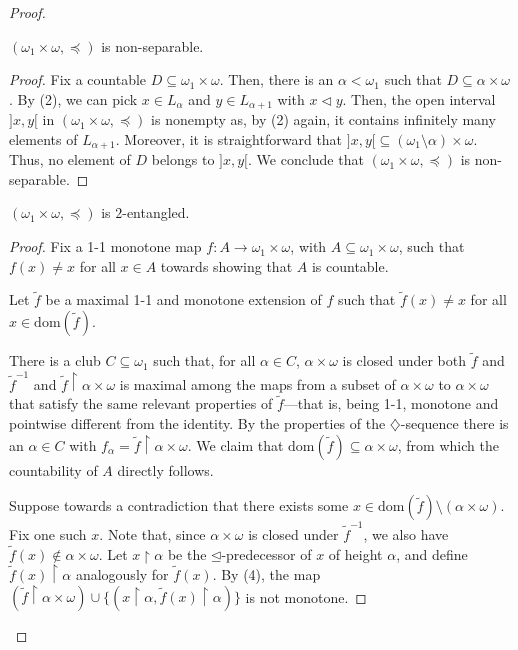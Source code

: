 \documentclass[10pt,a4paper]{amsart}
\begin{document}
\begin{proof}
\begin{claim}
$(\omega_1 \times \omega, \preceq)$ is non-separable.
\end{claim}
\begin{proof}
Fix a countable $D\subseteq \omega_1 \times \omega$. Then, there is an $\alpha < \omega_1$ such that $D\subseteq \alpha \times \omega$. By (2), we can pick $x \in L_\alpha$  and $y \in L_{\alpha+1}$  with $x \lhd y$. Then, the open interval $]x, y[$ in $(\omega_1 \times \omega, \preceq)$ is nonempty as, by (2) again, it contains infinitely many elements of $L_{\alpha+1}$. Moreover, it is straightforward that ${]x,y[} \subseteq (\omega_1\setminus \alpha) \times \omega$. Thus, no element of $D$ belongs to $]x,y[$. We conclude that $(\omega_1 \times \omega, \preceq)$ is non-separable.
\end{proof}


\begin{claim}
$(\omega_1 \times \omega, \preceq)$ is $2$-entangled.
\end{claim}
\begin{proof}
Fix a 1-1 monotone map $f: A \rightarrow \omega_1 \times \omega$, with $A \subseteq \omega_1 \times \omega$, such that $f(x) \neq x$ for all $x \in A$ towards showing that $A$ is countable.

Let $\tilde{f}$ be a maximal 1-1 and monotone extension of $f$ such that $\tilde{f}(x) \neq x$ for all $x \in \mathrm{dom}(\tilde{f})$.


There is a club $C\subseteq\omega_1$ such that, for all $\alpha \in C$, $\alpha \times \omega$ is closed under both $\tilde{f}$ and $\tilde{f}^{-1}$ and  $\tilde{f}  \upharpoonright \alpha \times \omega$ is maximal among the maps from a subset of $\alpha \times \omega$ to $\alpha\times \omega$ that satisfy the same relevant properties of $\tilde{f}$---that is, being 1-1, monotone and pointwise different from the identity. By the properties of the $\diamondsuit$-sequence there is an $\alpha \in C$ with $f_\alpha = \tilde{f} \upharpoonright \alpha \times \omega$. We claim that $\mathrm{dom}(\tilde{f}) \subseteq \alpha \times \omega$, from which the countability of $A$ directly follows.

Suppose towards a contradiction that there exists some $x \in \mathrm{dom}(\tilde{f}) \setminus (\alpha \times \omega)$. Fix one such $x$. Note that, since $\alpha \times \omega$ is closed under $\tilde{f}^{-1}$, we also have $\tilde{f}(x) \not\in \alpha \times \omega$.  Let $x \upharpoonright \alpha$ be the $\unlhd$-predecessor of $x$ of height $\alpha$, and define $\tilde{f}(x) \upharpoonright \alpha$ analogously for $\tilde{f}(x)$.  By (4), the map $(\tilde{f} \upharpoonright \alpha \times \omega) \cup \{(x \upharpoonright \alpha, \tilde{f}(x) \upharpoonright \alpha)\}$ is not monotone.


\end{proof}
\end{proof}
\end{document}
